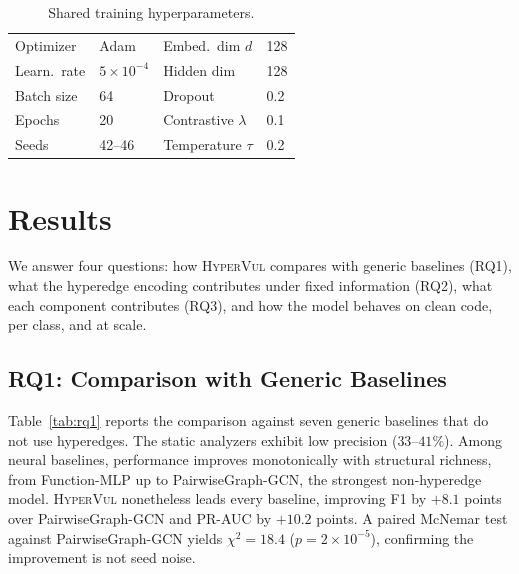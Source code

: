 \documentclass[conference]{IEEEtran}
\newcommand{\hypervul}{\textsc{HyperVul}}
\begin{document}
\begin{table}[t]
\caption{Shared training hyperparameters.}
\label{tab:hparams}
\centering
\setlength{\tabcolsep}{4pt}
\renewcommand{\arraystretch}{1.05}
\begin{tabular}{ll@{\hskip 10pt}ll}
\toprule
Optimizer & Adam & Embed.\ dim $d$ & 128 \\
Learn.\ rate & $5\times10^{-4}$ & Hidden dim & 128 \\
Batch size & 64 & Dropout & 0.2 \\
Epochs & 20 & Contrastive $\lambda$ & 0.1 \\
Seeds & 42--46 & Temperature $\tau$ & 0.2 \\
\bottomrule
\end{tabular}
\end{table}

\section{Results}
\label{sec:results}

We answer four questions: how \hypervul{} compares with generic baselines (RQ1), what
the hyperedge encoding contributes under fixed information (RQ2), what each component
contributes (RQ3), and how the model behaves on clean code, per class, and at scale.

\subsection{RQ1: Comparison with Generic Baselines}
Table~\ref{tab:rq1} reports the comparison against seven generic baselines that do not
use hyperedges. The static analyzers exhibit low precision ($33$--$41\%$). Among
neural baselines, performance improves monotonically with structural richness, from
Function-MLP up to PairwiseGraph-GCN, the strongest non-hyperedge model. \hypervul{}
nonetheless leads every baseline, improving F1 by $+8.1$ points over PairwiseGraph-GCN
and PR-AUC by $+10.2$ points. A paired McNemar test against PairwiseGraph-GCN yields
$\chi^2{=}18.4$ ($p{=}2\times10^{-5}$), confirming the improvement is not seed noise.
\end{document}
